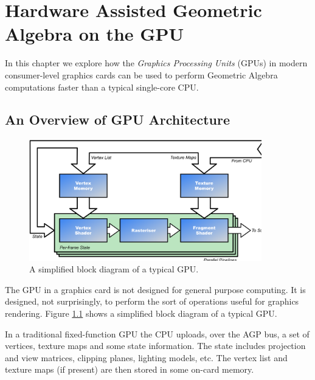 \begin{savequote}
\end{savequote}

\chapter{Hardware Assisted Geometric Algebra on the GPU}

In this chapter we explore how the \emph{Graphics Processing
Units} (GPUs) in modern consumer-level graphics cards can be
used to perform Geometric Algebra computations faster than a 
typical single-core CPU.

\section{An Overview of GPU Architecture}

\begin{figure}
\centering
\includegraphics[width=0.9\textwidth]{gpu_architecture}
\caption{\label{fig:gpu_architecture}%
  A simplified block diagram of a typical GPU.}
\end{figure}

The GPU in a graphics card is not designed for general purpose 
computing. It is designed, not surprisingly, to perform the
sort of operations useful for graphics rendering. Figure
\ref{fig:gpu_architecture} shows a simplified block diagram of
a typical GPU.

In a traditional fixed-function GPU the CPU uploads, over the AGP
bus, a set of vertices, texture maps and some state information. The
state includes projection and view matrices, clipping planes, 
lighting models, etc. The vertex list and texture maps (if present) 
are then stored in some on-card memory.


